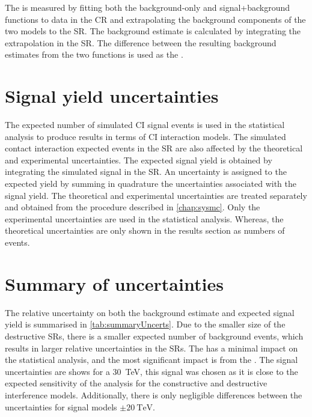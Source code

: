 The \CRBU is measured by fitting both the background-only and signal+background functions to data in the CR and extrapolating the background components of the two models to the SR. The background estimate is calculated by integrating the extrapolation in the SR. The difference between the resulting background estimates from the two functions is used as the \CRBU. 

\section{Signal yield uncertainties}\label{sec:uncertBkgmodel:signalyield}
The expected number of simulated CI signal events is used in the statistical analysis to produce results in terms of CI interaction models. The simulated contact interaction expected events in the SR are also affected by the theoretical and experimental uncertainties. The expected signal yield is obtained by integrating the simulated signal in the SR. An uncertainty is assigned to the expected yield by summing in quadrature the uncertainties associated with the signal yield. The theoretical and experimental uncertainties are treated separately and obtained from the procedure described in \cref{chap:sysmc}. Only the experimental uncertainties are used in the statistical analysis. Whereas, the theoretical uncertainties are only shown in the results section as numbers of events. 

\section{Summary of uncertainties}\label{sec:uncertBkgmodel:summary}

The relative uncertainty on both the background estimate and expected signal yield is summarised in \cref{tab:summaryUncerts}. Due to the smaller size of the destructive SRs, there is a smaller expected number of background events, which results in larger relative uncertainties in the SRs. The \CRBU has a minimal impact on the statistical analysis, and the most significant impact is from the \STATU. The signal uncertainties are shows for a \SI{30}{\tera\electronvolt}, this signal was chosen as it is close to the expected sensitivity of the analysis for the constructive and destructive interference models. Additionally, there is only negligible differences between the uncertainties for signal models $\pm \SI{20}{\tera\electronvolt}$.

